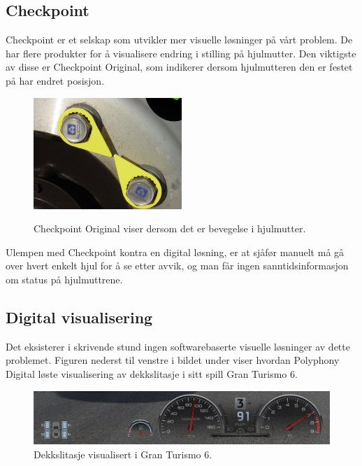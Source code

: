 \subsection{Checkpoint}
Checkpoint er et selskap som utvikler mer visuelle løsninger på vårt problem.
De har flere produkter for å visualisere endring i stilling på hjulmutter. Den 
viktigste av disse er Checkpoint Original\cite{checkpoint1}, 
som indikerer dersom hjulmutteren den er festet på har endret posisjon. 
	\newline
	\begin{figure}[H]
		\centering
		\includegraphics[width=0.50\textwidth]{images/checkpoint-original.jpg}
		\label{fig:checkpoint}
		\caption{Checkpoint Original viser dersom det er bevegelse i hjulmutter.}
	\end{figure}
Ulempen med Checkpoint kontra en digital løsning, er at sjåfør manuelt må gå over 
hvert enkelt hjul for å se etter avvik, og man får ingen sanntidsinformasjon om 
status på hjulmuttrene.

\subsection{Digital visualisering}
Det eksisterer i skrivende stund ingen softwarebaserte visuelle løsninger av dette 
problemet. Figuren nederst til venstre i bildet under viser hvordan  
Polyphony Digital løste visualisering av 
dekkslitasje i sitt spill Gran Turismo 6.\cite{dekkslitasje-GT6} 
	\newline
	\begin{figure}[H]
		\centering
		\includegraphics[width=1.00\textwidth]{images/gran-turismo-6-screenshot.jpg}
		\caption{Dekkslitasje visualisert i Gran Turismo 6.}
	\end{figure}
